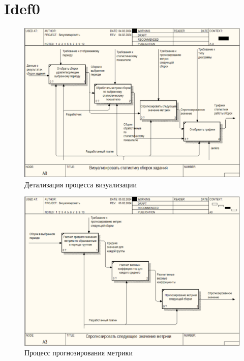 \chapter{Idef0}\label{appendix-extra-examples}

\begin{figure}[ht!] 
	\center
	\includegraphics [scale=0.7] {my_folder/images//er2}
	\caption{Детализация процесса визуализации} 
	\label{fig:er2}  
\end{figure}

\begin{figure}[ht!] 
	\center
	\includegraphics [scale=0.7] {my_folder/images//er3}
	\caption{Процесс прогнозирования метрики} 
	\label{fig:er3}  
\end{figure}

